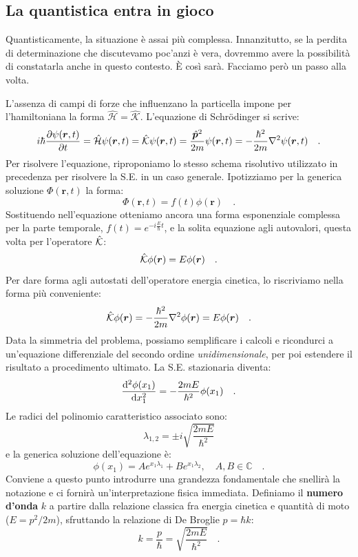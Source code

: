 \subsection{La quantistica entra in gioco}
Quantisticamente, la situazione è assai più complessa. Innanzitutto, se la perdita di determinazione che discutevamo poc'anzi è vera, dovremmo avere la possibilità di constatarla anche in questo contesto. È così sarà. Facciamo però un passo alla volta. 

L'assenza di campi di forze che influenzano la particella impone per l'hamiltoniana la forma $\hat{\mathcal{H}} = \hat{\mathcal{K}}$. L'equazione di Schrödinger si scrive:
\[
    i\hbar\pdv{\psi(\bm{r},t)}{t} = \hat{\mathcal{H}}\psi(\bm{r},t) = \hat{\mathcal{K}}\psi(\bm{r},t) = \frac{\hat{\bm{p}}^2}{2m}\psi(\bm{r},t) = -\frac{\hbar^2}{2m}\nabla^2\psi(\bm{r},t) \quad.
\]
Per risolvere l'equazione, riproponiamo lo stesso schema risolutivo utilizzato in precedenza per risolvere la S.E. in un caso generale. Ipotizziamo per la generica soluzione $\Phi(\bm{r},t)$ la forma:
\[
    \Phi(\bm{r},t) = f(t)\phi(\bm{r}) \quad. 
\]
Sostituendo nell'equazione otteniamo ancora una forma esponenziale complessa per la parte temporale, $f(t) = e^{-i\frac{E}{\hbar}t}$, e la solita equazione agli autovalori, questa volta per l'operatore $\hat{\mathcal{K}}$:
\begin{equation}
    \hat{\mathcal{K}}\phi(\bm{r}) = E\phi(\bm{r}) \quad.
    \label{eq:eigen_K}
\end{equation}
Per dare forma agli autostati dell'operatore energia cinetica, lo riscriviamo nella forma più conveniente:
\[
    \hat{\mathcal{K}}\phi(\bm{r}) = -\frac{\hbar^2}{2m}\nabla^2\phi(\bm{r}) = E\phi(\bm{r}) \quad.
\]
Data la simmetria del problema, possiamo semplificare i calcoli e ricondurci a un'equazione differenziale del secondo ordine \emph{unidimensionale}, per poi estendere il risultato a procedimento ultimato. La S.E. stazionaria diventa:
\[
    \dv[2]{\phi(x_1)}{x_1} = -\frac{2mE}{\hbar^2}\phi(x_1) \quad.
\]
Le radici del polinomio caratteristico associato sono:
\[
    \lambda_{1,2} = \pm i\sqrt{\frac{2mE}{\hbar^2}}
\]
e la generica soluzione dell'equazione è:
\[
    \phi(x_1) = Ae^{x_1\lambda_1} + Be^{x_1\lambda_2}, \quad A,B \in \mathbb{C} \quad.
\]
Conviene a questo punto introdurre una grandezza fondamentale che snellirà la notazione e ci fornirà un'interpretazione fisica immediata. Definiamo il \textbf{numero d'onda} $k$ a partire dalla relazione classica fra energia cinetica e quantità di moto ($E = p^2/2m$), sfruttando la relazione di De Broglie $p = \hbar k$:
\begin{equation}
    k = \frac{p}{\hbar} = \sqrt{\frac{2mE}{\hbar^2}} \quad.
\end{equation}

